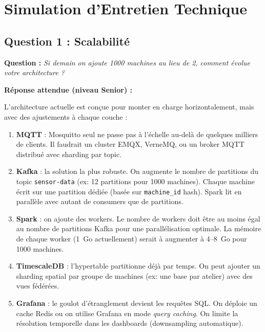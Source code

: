 \documentclass[11pt,a4paper]{article}
\begin{document}
\newpage

\section{Simulation d'Entretien Technique}

\subsection{Question 1 : Scalabilité}

\textbf{Question :} \textit{Si demain on ajoute 1000 machines au lieu de 2, comment évolue votre architecture ?}

\textbf{Réponse attendue (niveau Senior) :}

L'architecture actuelle est conçue pour monter en charge horizontalement, mais avec des ajustements à chaque couche :

\begin{enumerate}
    \item \textbf{MQTT} : Mosquitto seul ne passe pas à l'échelle au-delà de quelques milliers de clients. Il faudrait un cluster EMQX, VerneMQ, ou un broker MQTT distribué avec sharding par topic.
    \item \textbf{Kafka} : la solution la plus robuste. On augmente le nombre de partitions du topic \texttt{sensor-data} (ex: 12 partitions pour 1000 machines). Chaque machine écrit sur une partition dédiée (basée sur \texttt{machine\_id} hash). Spark lit en parallèle avec autant de consumers que de partitions.
    \item \textbf{Spark} : on ajoute des workers. Le nombre de workers doit être au moins égal au nombre de partitions Kafka pour une parallélisation optimale. La mémoire de chaque worker (1~Go actuellement) serait à augmenter à 4--8~Go pour 1000 machines.
    \item \textbf{TimescaleDB} : l'hypertable partitionne déjà par temps. On peut ajouter un sharding spatial par groupe de machines (ex: une base par atelier) avec des vues fédérées.
    \item \textbf{Grafana} : le goulot d'étranglement devient les requêtes SQL. On déploie un cache Redis ou on utilise Grafana en mode \emph{query caching}. On limite la résolution temporelle dans les dashboards (downsampling automatique).
\end{enumerate}
\end{document}
